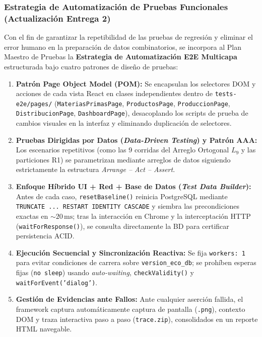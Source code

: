 \documentclass[11pt,a4paper]{article}
\begin{document}
\subsubsection{Estrategia de Automatización de Pruebas Funcionales (Actualización Entrega 2)}
Con el fin de garantizar la repetibilidad de las pruebas de regresión y eliminar el error humano en la preparación de datos combinatorios, se incorpora al Plan Maestro de Pruebas la \textbf{Estrategia de Automatización E2E Multicapa} estructurada bajo cuatro patrones de diseño de pruebas:
\begin{enumerate}
    \item \textbf{Patrón Page Object Model (POM):} Se encapsulan los selectores DOM y acciones de cada vista React en clases independientes dentro de \texttt{tests-e2e/pages/} (\texttt{MateriasPrimasPage}, \texttt{ProductosPage}, \texttt{ProduccionPage}, \texttt{DistribucionPage}, \texttt{DashboardPage}), desacoplando los scripts de prueba de cambios visuales en la interfaz y eliminando duplicación de selectores.
    \item \textbf{Pruebas Dirigidas por Datos (\textit{Data-Driven Testing}) y Patrón AAA:} Los escenarios repetitivos (como las 9 corridas del Arreglo Ortogonal $L_9$ y las particiones R1) se parametrizan mediante arreglos de datos siguiendo estrictamente la estructura \textit{Arrange -- Act -- Assert}.
    \item \textbf{Enfoque Híbrido UI + Red + Base de Datos (\textit{Test Data Builder}):} Antes de cada caso, \texttt{resetBaseline()} reinicia PostgreSQL mediante \texttt{TRUNCATE ... RESTART IDENTITY CASCADE} y siembra las precondiciones exactas en $\sim 20\,\text{ms}$; tras la interacción en Chrome y la interceptación HTTP (\texttt{waitForResponse()}), se consulta directamente la BD para certificar persistencia ACID.
    \item \textbf{Ejecución Secuencial y Sincronización Reactiva:} Se fija \texttt{workers: 1} para evitar condiciones de carrera sobre \texttt{version\_eco\_db}; se prohíben esperas fijas (\texttt{no sleep}) usando \textit{auto-waiting}, \texttt{checkValidity()} y \texttt{waitForEvent('dialog')}.
    \item \textbf{Gestión de Evidencias ante Fallos:} Ante cualquier aserción fallida, el framework captura automáticamente captura de pantalla (\texttt{.png}), contexto DOM y traza interactiva paso a paso (\texttt{trace.zip}), consolidados en un reporte HTML navegable.
\end{enumerate}
\end{document}
